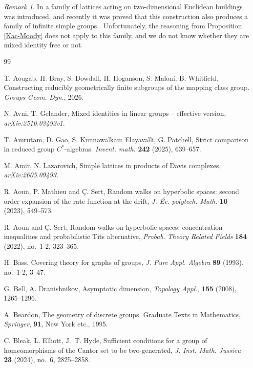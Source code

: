 \documentclass[11pt,letterpaper]{article}
\theoremstyle{definition}
\theoremstyle{remark}
\newtheorem{rem}[thm]{Remark}
\begin{document}
\begin{rem}
In \cite{TMW} a family of lattices acting on two-dimensional Euclidean buildings was introduced, and recently it was proved that this construction also produces a family of infinite simple groups \cite{LW}. Unfortunately, the reasoning from Proposition \ref{Kac-Moody} does not apply to this family, and we do not know whether they are mixed identity free or not.  
\end{rem}

\begin{thebibliography}{99}

T. Aougab, H. Bray, S. Dowdall, H. Hoganson, S. Maloni, B. Whitfield, Constructing reducibly geometrically finite subgroups of the mapping class group. \emph{Groups Geom. Dyn.}, 2026.

N. Avni, T. Gelander, Mixed identities in linear groups -- effective version,  \emph{arXiv:2510.03492v1}.

T. Amrutam, D. Gao, S. Kunnawalkam Elayavalli, G. Patchell, Strict comparison in reduced group $C^*$-algebras. \emph {Invent. math.} \textbf{242} (2025), 639--657.

M. Amir, N. Lazarovich, Simple lattices in products of Davis complexes, \emph{arXiv:2605.09493}.

R. Aoun, P. Mathieu and \c C. Sert, Random walks on hyperbolic spaces: second order expansion of the rate function at the drift, \emph{J. \'Ec. polytech. Math.} \textbf{10} (2023), 549--573.

R. Aoun and \c C. Sert, Random walks on hyperbolic spaces: concentration inequalities and probabilistic Tits alternative, \emph{Probab. Theory Related Fields} {\bf 184} (2022), no.~1-2, 323--365.


H. Bass, Covering theory for graphs of groups, \emph{J. Pure Appl. Algebra} {\bf 89} (1993), no.~1-2, 3--47.

G. Bell, A. Dranishnikov, Asymptotic dimension, \emph{Topology Appl.}, \textbf{155} (2008), 1265--1296.

A. Beardon, The geometry of discrete groups. Graduate Texts in Mathematics, \emph{Springer}, {\bf 91}, New York etc., 1995.

C. Bleak, L. Elliott, J.~T. Hyde, Sufficient conditions for a group of homeomorphisms of the Cantor set to be two-generated, \emph{J. Inst. Math. Jussieu} {\bf 23} (2024), no.~6, 2825--2858.


\end{thebibliography}
\end{document}
